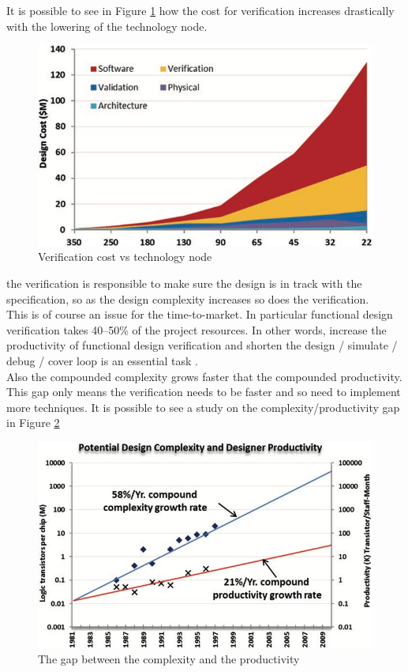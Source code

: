 It is possible to see in Figure \ref{verification-tecnology} how the cost for verification increases drastically with the lowering of the technology node.


\begin{figure}[H]
    \centering
    \includegraphics[scale = 0.6]{Chapter_1/img/verification-tecnology.png}
    \caption{Verification cost vs technology node \cite{verification-book-2018}}
    \label{verification-tecnology}
\end{figure}

the verification is responsible to make sure the design is in track with the specification, so as the design complexity increases so does the verification.\\

This is of course an issue for the time-to-market. 
In particular functional design verification takes 40–50\% of the project resources. In other words, increase the productivity of functional design verification and shorten the design / simulate / debug / cover loop is an essential task \cite{verification-book-2018}.\\

Also the compounded complexity grows faster that the compounded productivity. This gap only means the verification needs to be faster and so need to implement more techniques.
It is possible to see a study on the complexity/productivity gap in Figure \ref{complexity-gap}
\begin{figure}[H]
    \centering
    \includegraphics[scale = 0.5]{Chapter_1/img/complexity-gap.png}
    \caption{The gap between the complexity and the productivity \cite{verification-book-2018}}
    \label{complexity-gap}
\end{figure}


